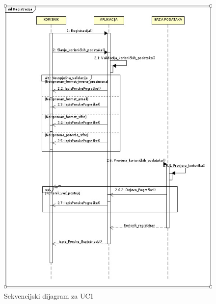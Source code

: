 \begin{figure}[H]
	\includegraphics[scale=0.65]{slike/sekvencijski_dijagram_registracija.jpeg} %
	\centering
	\caption {Sekvencijski dijagram za UC1}
	\label{fig:promjene}
\end{figure}

